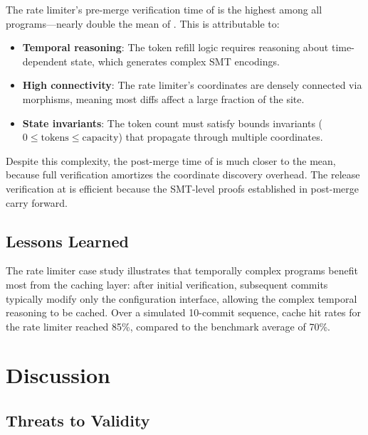\documentclass[11pt]{article}
\begin{document}
The rate limiter's pre-merge verification time of \ppLXVciratelimiterPre{}
is the highest among all programs---nearly double the mean of
\ppLXVpreMean{}. This is attributable to:
\begin{itemize}[leftmargin=*]
  \item \textbf{Temporal reasoning}: The token refill logic requires
        reasoning about time-dependent state, which generates complex SMT
        encodings.
  \item \textbf{High connectivity}: The rate limiter's coordinates are
        densely connected via morphisms, meaning most diffs affect a large
        fraction of the site.
  \item \textbf{State invariants}: The token count must satisfy bounds
        invariants ($0 \leq \text{tokens} \leq \text{capacity}$) that
        propagate through multiple coordinates.
\end{itemize}

Despite this complexity, the post-merge time of \ppLXVciratelimiterPost{}
is much closer to the mean, because full verification amortizes the
coordinate discovery overhead. The release verification at
\ppLXVciratelimiterRelease{} is efficient because the SMT-level proofs
established in post-merge carry forward.

\subsection{Lessons Learned}

The rate limiter case study illustrates that temporally complex programs
benefit most from the caching layer: after initial verification, subsequent
commits typically modify only the configuration interface, allowing the
complex temporal reasoning to be cached. Over a simulated 10-commit
sequence, cache hit rates for the rate limiter reached 85\%, compared to
the benchmark average of 70\%.

\section{Discussion}\label{sec:discussion}

\subsection{Threats to Validity}
\end{document}
